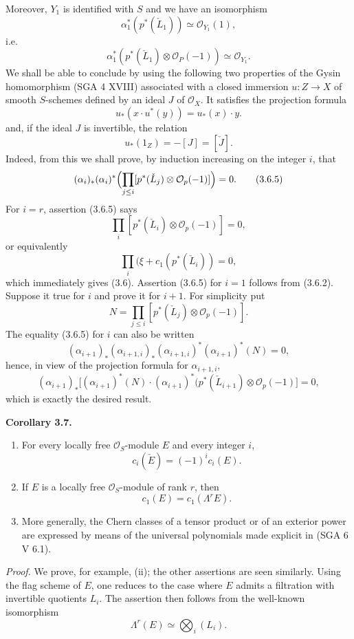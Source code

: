 \documentclass[11pt]{article}
\newenvironment{statement}[1]{\par\medskip\noindent\textbf{#1.}\ }{\par\medskip}
\begin{document}
Moreover, $Y_1$ is identified with $S$ and we have an isomorphism
\[
\alpha_1^*(p^*(\check L_1))\simeq\mathcal O_{Y_1}(1),
\]
i.e.
\[
\alpha_1^*(p^*(\check L_1)\otimes\mathcal O_P(-1))\simeq \mathcal O_{Y_1}.
\tag{3.6.2}
\]
We shall be able to conclude by using the following two properties of the Gysin homomorphism (SGA 4 XVIII) associated with a closed immersion $u:Z\to X$ of smooth $S$-schemes defined by an ideal $J$ of $\mathcal O_X$. It satisfies the projection formula
\[
u_*(x\cdot u^*(y))=u_*(x)\cdot y.
\tag{3.6.3}
\]
and, if the ideal $J$ is invertible, the relation
\[
u_*(1_Z)=-[J]=[\check J].
\tag{3.6.4}
\]
Indeed, from this we shall prove, by induction increasing on the integer $i$, that
\[
(\alpha_i)_*(\alpha_i)^*\Bigl(\prod_{j\le i}[p^*(\check L_j)\otimes\mathcal O_p(-1)]\Bigr)=0.
\tag{3.6.5}
\]
For $i=r$, assertion (3.6.5) says
\[
\prod_i[p^*(\check L_i)\otimes\mathcal O_p(-1)]=0,
\]
or equivalently
\[
\prod_i(\xi+c_1(p^*(\check L_i))=0,
\]
which immediately gives (3.6). Assertion (3.6.5) for $i=1$ follows from (3.6.2). Suppose it true for $i$ and prove it for $i+1$. For simplicity put
\[
N=\prod_{j\le i}[p^*(\check L_j)\otimes\mathcal O_p(-1)].
\]
The equality (3.6.5) for $i$ can also be written
\[
(\alpha_{i+1})_*(\alpha_{i+1,i})_*(\alpha_{i+1,i})^*(\alpha_{i+1})^*(N)=0,
\]
hence, in view of the projection formula for $\alpha_{i+1,i}$,
\[
(\alpha_{i+1})_*\bigl[(\alpha_{i+1})^*(N)\cdot(\alpha_{i+1})^*(p^*(\check L_{i+1})\otimes\mathcal O_p(-1)\bigr]=0,
\]
which is exactly the desired result.

\begin{statement}{Corollary 3.7}
\begin{enumerate}[label=(\roman*)]
\item For every locally free $\mathcal O_S$-module $E$ and every integer $i$,
\[
c_i(\check E)=(-1)^i c_i(E).
\]
\item If $E$ is a locally free $\mathcal O_S$-module of rank $r$, then
\[
c_1(E)=c_1(\Lambda^rE).
\]
\item More generally, the Chern classes of a tensor product or of an exterior power are expressed by means of the universal polynomials made explicit in (SGA 6 V 6.1).
\end{enumerate}
\end{statement}

\emph{Proof.} We prove, for example, (ii); the other assertions are seen similarly. Using the flag scheme of $E$, one reduces to the case where $E$ admits a filtration with invertible quotients $L_i$. The assertion then follows from the well-known isomorphism
\[
\Lambda^r(E)\simeq\bigotimes_i (L_i).
\]
\end{document}
